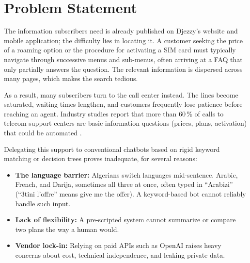 \documentclass[12pt, a4paper]{report}
\newcommand{\sourced}[1]{#1}        %
\newcommand{\humantext}[1]{#1}      %
\begin{document}
\section*{Problem Statement}
\humantext{The information subscribers need is already published on Djezzy's website and mobile application; the difficulty lies in locating it.} \humantext{A customer seeking the price of a roaming option or the procedure for activating a SIM card must typically navigate through successive menus and sub-menus, often arriving at a FAQ that only partially answers the question. The relevant information is dispersed across many pages, which makes the search tedious.}

\humantext{As a result, many subscribers turn to the call center instead. The lines become saturated, waiting times lengthen, and customers frequently lose patience before reaching an agent.} \sourced{Industry studies report that more than 60\,\% of calls to telecom support centers are basic information questions (prices, plans, activation) that could be automated \cite{gartner2023}.}

\humantext{Delegating this support to conventional chatbots based on rigid keyword matching or decision trees proves inadequate, for several reasons:}
\begin{itemize}[noitemsep]
    \item \humantext{\textbf{The language barrier:} Algerians switch languages mid-sentence. Arabic, French, and Darija, sometimes all three at once, often typed in ``Arabizi'' (``3tini l'offre'' means give me the offer). A keyword-based bot cannot reliably handle such input.}
    \item \humantext{\textbf{Lack of flexibility:} A pre-scripted system cannot summarize or compare two plans the way a human would.}
    \item \humantext{\textbf{Vendor lock-in:} Relying on paid APIs such as OpenAI raises heavy concerns about cost, technical independence, and leaking private data.}
\end{itemize}
\end{document}

